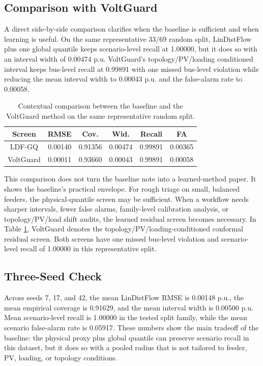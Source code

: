 \documentclass[
  journal]{IEEEtran}
\begin{document}
\subsection{Comparison with VoltGuard}\label{comparison-with-voltguard}

A direct side-by-side comparison clarifies when the baseline is
sufficient and when learning is useful. On the same representative 33/69
random split, LinDistFlow plus one global quantile keeps scenario-level
recall at 1.00000, but it does so with an interval width of 0.00474 p.u.
VoltGuard's topology/PV/loading conditioned interval keeps bus-level
recall at 0.99891 with one missed bus-level violation while reducing the
mean interval width to 0.00043 p.u. and the false-alarm rate to 0.00058.

\begin{table}[t]
\centering
\caption{Contextual comparison between the baseline and the VoltGuard method on the same representative random split.}
\label{tab:baseline_vs_voltguard}
\begin{tabular}{cccccc}
\hline
Screen & RMSE & Cov. & Wid. & Recall & FA \\
\hline
LDF-GQ & 0.00140 & 0.91356 & 0.00474 & 0.99891 & 0.00365 \\
VoltGuard & 0.00011 & 0.93660 & 0.00043 & 0.99891 & 0.00058 \\
\hline
\end{tabular}
\end{table}

This comparison does not turn the baseline note into a learned-method
paper. It shows the baseline's practical envelope. For rough triage on
small, balanced feeders, the physical-quantile screen may be sufficient.
When a workflow needs sharper intervals, fewer false alarms,
family-level calibration analysis, or topology/PV/load shift audits, the
learned residual screen becomes necessary. In Table
\ref{tab:baseline_vs_voltguard}, VoltGuard denotes the
topology/PV/loading-conditioned conformal residual screen. Both screens
have one missed bus-level violation and scenario-level recall of 1.00000
in this representative split.

\subsection{Three-Seed Check}\label{three-seed-check}

Across seeds 7, 17, and 42, the mean LinDistFlow RMSE is 0.00148 p.u.,
the mean empirical coverage is 0.91629, and the mean interval width is
0.00500 p.u. Mean scenario-level recall is 1.00000 in the tested split
family, while the mean scenario false-alarm rate is 0.05917. These
numbers show the main tradeoff of the baseline: the physical proxy plus
global quantile can preserve scenario recall in this dataset, but it
does so with a pooled radius that is not tailored to feeder, PV,
loading, or topology conditions.
\end{document}
